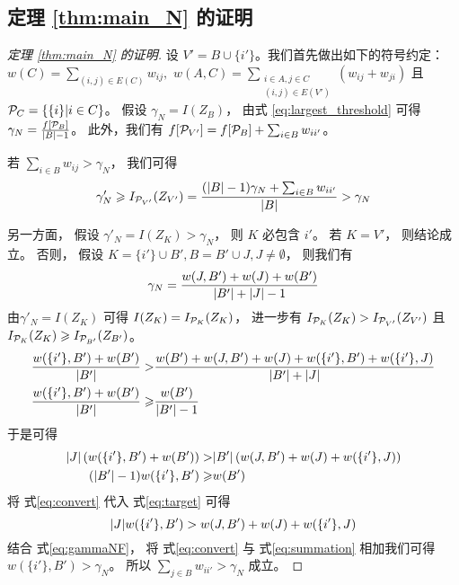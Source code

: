 \subsection{定理 \ref{thm:main_N} 的证明}
    \begin{proof}[定理 \ref{thm:main_N} 的证明]
      设 $V' = B \cup \{i'\}$。我们首先做出如下的符号约定：
      $w(C) = \displaystyle\sum_{(i,j) \in E(C)} w_{ij},$
      $w(A, C) = \displaystyle\sum_{\substack{i \in A, j \in C \\ (i,j) \in E(V')}} (w_{ij}+w_{ji})$ 且
      $\P_C = \{\{i \}| i \in C \}$。
      假设 $\gamma_N = I(Z_B)$，
      由式 \eqref{eq:largest_threshold} 可得
      $\gamma_N =\frac{f[\P_B]} {\abs{B} -1}$。
      此外，我们有
      $f[\P_{V'}] = f[\P_B] + \sum_{i \in B}w_{ii'}$。
      
      若 $ \sum_{i \in B} w_{ij} > \gamma_N$， 我们可得
      $$
      \gamma'_N \geq I_{\P_{V'}}(Z_{V'}) = \frac{(\abs{B}-1)\gamma_N
      + \sum_{i \in B}w_{ii'}}{\abs{B}} > \gamma_N
      $$
      
      另一方面， 假设 
      $\gamma'_N = I(Z_K) > \gamma_N$，
      则 $K$ 必包含 $i'$。
      若 $K=V'$， 则结论成立。
      否则， 假设 $K = \{i'\} \cup B', B=B'\cup J, J\neq \emptyset$，
      则我们有
      \begin{equation}\label{eq:gammaNF}
      \gamma_N = \frac{w(J,B') + w(J) + w(B')}{ \abs{B'} + \abs{J} - 1 }
      \end{equation}
      由$\gamma'_N = I(Z_K)$ 可得  $I(Z_K) = I_{\P_K}(Z_K)$，
      进一步有 $I_{\P_K}(Z_K) > I_{\P_{V'}}(Z_{V'})$ 且
      $I_{\P_K}(Z_K) \geq I_{\P_{B'}}(Z_{B'})$。
      \begin{align*}
      \frac{w(\{i'\}, B') + w(B')}{\abs{B'}} >& \frac{w(B') + w(J, B') + w(J) + w(\{i'\}, B') + w(\{i'\}, J)}{\abs{B'} + \abs{J}}  \\
      \frac{w(\{i'\}, B') + w(B')}{\abs{B'}} \geq & \frac{w(B')}{\abs{B'} - 1}
      \end{align*}
      于是可得
      \begin{align}
      \abs{J} \left(w(\{i'\}, B') + w(B') \right) > &
      \abs{B'} \left(w(J, B') + w(J) + w(\{i'\}, J) \right)
      \label{eq:target}
      \\
      (\abs{B'} - 1)  w(\{i'\}, B') \geq & w(B') \label{eq:convert}
      \end{align}
      将 式\eqref{eq:convert} 代入 式\eqref{eq:target} 可得
      \begin{equation}\label{eq:summation}
      \abs{J} w(\{i'\}, B') > w(J, B') + w(J) + w(\{i'\}, J)
      \end{equation}
      结合 式\eqref{eq:gammaNF}，
      将 式\eqref{eq:convert} 与 式\eqref{eq:summation} 相加我们可得
      $w(\{i'\}, B') > \gamma_N$。
      所以 $\sum_{j \in B}w_{ii'} > \gamma_N $ 成立。
    \end{proof}
  
